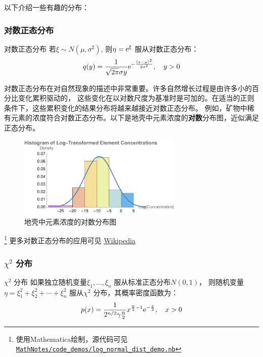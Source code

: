 以下介绍一些有趣的分布：

\subsubsection{对数正态分布}

\begin{definition}{对数正态分布}
    若\(\xi\sim N(\mu,\sigma^{2})\), 则\(\eta=\mathrm{e}^{\xi} \) 服从对数正态分布：
    \[
        q(y) = \frac{1}{\sqrt{2\pi}\sigma y}
        \mathrm{e}^{-\frac{(x-\mu)^{2}}{2\sigma^{2}}},\quad y>0
    \]
\end{definition}

对数正态分布在对自然现象的描述中非常重要。许多自然增长过程是由许多小的百分比变化累积驱动的，
这些变化在以对数尺度为基准时是可加的。在适当的正则条件下，这些累积变化的结果分布将越来越接近对数正态分布。
例如，矿物中稀有元素的浓度符合对数正态分布。以下是地壳中元素浓度的\textbf{对数}分布图，近似满足正态分布。
\begin{figure}[H]
    \centering
    \includegraphics[width=0.7\textwidth]{resources/element_concentration.pdf}
    \caption{地壳中元素浓度的对数分布图}
    \label{fig:lognormal}
\end{figure}\footnote{使用Mathematica绘制，源代码可见
\href{https://github.com/Sazzzzzz/MathNotes/blob/main/code_demos/log_normal_dist_demo.nb}{\texttt{MathNotes/code_demos/log_normal_dist_demo.nb}}}
更多对数正态分布的应用可见
\href{https://en.wikipedia.org/wiki/Log-normal_distribution#Occurrence_and_applications}{Wikipedia}

\subsubsection{\(\chi^{2}\) 分布}
\begin{definition}{\(\chi^{2}\) 分布}
    如果独立随机变量\(\xi_{1}, \dots ,\xi_{n}\) 服从标准正态分布\(N(0,1)\)，
    则随机变量\(\eta = \xi_{1}^{2} + \xi_{2}^{2} + \cdots +
    \xi_{n}^{2}\) 服从\(\chi^{2}\) 分布，其概率密度函数为：
    \[
        p(x) = \frac{1}{2^{n/2} \gamma{\frac{n}{2}}}
        x^{\frac{n}{2}-1}
        \mathrm{e}^{-\frac{x}{2}}, \quad x>0
        \]
\end{definition}

